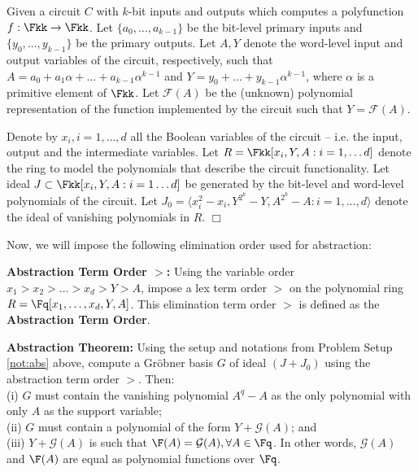 \begin{Setup}\label{not:abs}
Given a circuit $C$ with $k$-bit inputs and outputs which computes a
polyfunction $f: \Fkk \rightarrow \Fkk$. Let $\{a_0, \dots, a_{k-1}\}$
be the bit-level primary inputs and $\{y_0, \dots, y_{k-1}\}$ be the
primary outputs. Let $A, Y$ denote the word-level input and output
variables of the circuit, respectively, such that $A = a_0 + a_1
\alpha + \dots + a_{k-1}\alpha^{k-1}$ and $Y = y_0 + \dots +
y_{k-1}\alpha^{k-1}$, where $\alpha$ is a primitive element of $\Fkk$. 
Let ${\mathcal{F}}(A)$ be the (unknown) polynomial representation of
the function implemented by the circuit such that $Y =
{\mathcal{F}}(A)$.  

Denote by $x_i, i = 1, \dots, d$ all the Boolean variables of the
circuit -- i.e. the input, output and the intermediate
variables. Let $R = \Fkk[x_i, Y, A: i = 1, \dots d]$ denote the
ring to model the polynomials that describe 
the circuit functionality. Let ideal $J \subset \Fkk[x_i, Y, A: i = 1
  \dots d]$ be generated by the bit-level and word-level polynomials
of the circuit. Let $J_0 = \langle x_i^2-x_i, Y^{2^k} - Y, A^{2^k} - A: i =
1, \dots, d\rangle$ denote the ideal of vanishing polynomials in $R$. 
\hfill$\Box$
\end{Setup}

Now, we will impose the following elimination order used for
abstraction: 

\begin{Definition}
{\bf Abstraction Term Order $>$:} 
Using the variable order $x_1 > x_2 > \dots > x_d > Y > A$,
impose a lex term order $>$ on the polynomial ring $R = \Fq[x_1,
  \dots, x_d, Y, A]$. This elimination term order $>$ is defined as
the {\bf Abstraction Term Order}. 
\end{Definition}


\begin{Theorem} \label{thm:abs}
{\bf Abstraction Theorem:} Using the setup and notations from Problem
Setup \ref{not:abs} above, compute a Gr\"obner basis $G$ of ideal $(J
+ J_0)$ using the abstraction term order $>$. Then: \\
(i) $G$ must contain the vanishing polynomial $A^q - A$ as the only
polynomial with only $A$ as the support variable;\\
(ii) $G$ must contain a polynomial of the form $Y + {\mathcal{G}}(A)$;
and\\ 
(iii) $Y + {\mathcal{G}}(A)$ is such that $\F(A) = {\mathcal{G}}(A),
\forall A \in \Fq$. In other words, ${\mathcal{G}}(A)$ and $\F(A)$ are
equal as polynomial functions over $\Fq$.
\end{Theorem}

